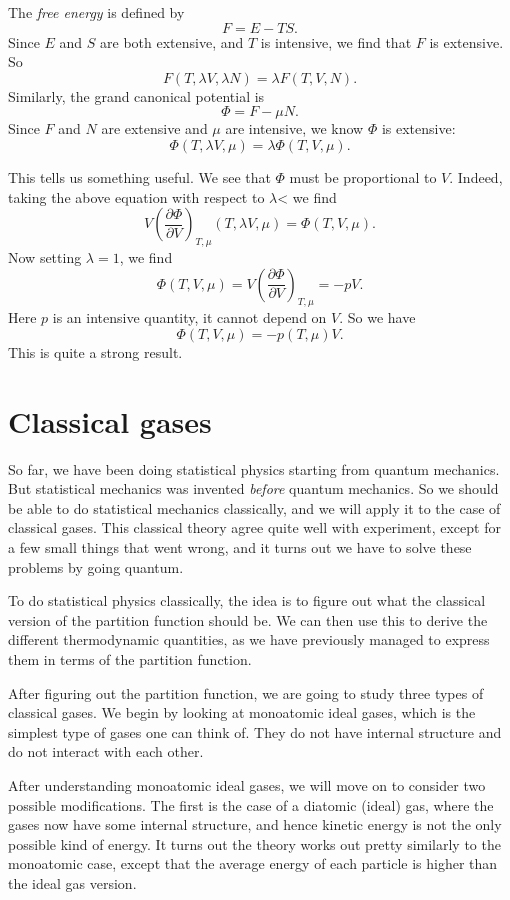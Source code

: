 \documentclass[a4paper]{article}
\begin{document}
\begin{eg}
  The \emph{free energy} is defined by
  \[
    F = E - TS.
  \]
  Since $E$ and $S$ are both extensive, and $T$ is intensive, we find that $F$ is extensive. So
  \[
    F (T, \lambda V, \lambda N) = \lambda F(T, V, N).
  \]
  Similarly, the grand canonical potential is
  \[
    \Phi = F - \mu N.
  \]
  Since $F$ and $N$ are extensive and $\mu$ are intensive, we know $\Phi$ is extensive:
  \[
    \Phi(T, \lambda V, \mu) = \lambda \Phi(T, V, \mu).
  \]
\end{eg}
This tells us something useful. We see that $\Phi$ must be proportional to $V$. Indeed, taking the above equation with respect to $\lambda$< we find
\[
  V \left(\frac{\partial \Phi}{\partial V}\right)_{T, \mu} (T, \lambda V, \mu) = \Phi(T, V, \mu).
\]
Now setting $\lambda = 1$, we find
\[
  \Phi(T, V, \mu) = V \left(\frac{\partial \Phi}{\partial V} \right)_{T, \mu} = -pV.
\]
Here $p$ is an intensive quantity, it cannot depend on $V$. So we have
\[
  \Phi(T, V, \mu) = -p(T, \mu) V.
\]
This is quite a strong result.

\section{Classical gases}
So far, we have been doing statistical physics starting from quantum mechanics. But statistical mechanics was invented \emph{before} quantum mechanics. So we should be able to do statistical mechanics classically, and we will apply it to the case of classical gases. This classical theory agree quite well with experiment, except for a few small things that went wrong, and it turns out we have to solve these problems by going quantum.

To do statistical physics classically, the idea is to figure out what the classical version of the partition function should be. We can then use this to derive the different thermodynamic quantities, as we have previously managed to express them in terms of the partition function.

After figuring out the partition function, we are going to study three types of classical gases. We begin by looking at monoatomic ideal gases, which is the simplest type of gases one can think of. They do not have internal structure and do not interact with each other.

After understanding monoatomic ideal gases, we will move on to consider two possible modifications. The first is the case of a diatomic (ideal) gas, where the gases now have some internal structure, and hence kinetic energy is not the only possible kind of energy. It turns out the theory works out pretty similarly to the monoatomic case, except that the average energy of each particle is higher than the ideal gas version.
\end{document}
